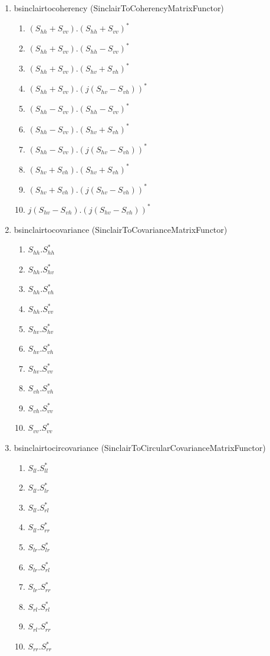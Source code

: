 \begin{enumerate}
\renewcommand{\labelenumii}{Channel \arabic{enumii} : }
\setcounter{enumi}{7}

\item bsinclairtocoherency (SinclairToCoherencyMatrixFunctor)
\begin{enumerate}
\item $ (S_{hh}+S_{vv}).(S_{hh}+S_{vv})^{*} $ 
\item $ (S_{hh}+S_{vv}).(S_{hh}-S_{vv})^{*} $ 
\item $ (S_{hh}+S_{vv}).(S_{hv}+S_{vh})^{*} $ 
\item $ (S_{hh}+S_{vv}).( j (S_{hv}-S_{vh}))^{*} $ 
\item $ (S_{hh}-S_{vv}).(S_{hh}-S_{vv})^{*} $ 
\item $ (S_{hh}-S_{vv}).(S_{hv}+S_{vh})^{*} $ 
\item $ (S_{hh}-S_{vv}).( j (S_{hv}-S_{vh}))^{*} $ 
\item $ (S_{hv}+S_{vh}).(S_{hv}+S_{vh})^{*} $ 
\item $ (S_{hv}+S_{vh}).( j (S_{hv}-S_{vh}))^{*} $ 
\item $ j (S_{hv}-S_{vh}).( j (S_{hv}-S_{vh}))^{*} $
\end{enumerate}
 
\item bsinclairtocovariance (SinclairToCovarianceMatrixFunctor)
\begin{enumerate}
\item $ S_{hh}.S_{hh}^{*} $ 
\item $ S_{hh}.S_{hv}^{*} $ 
\item $ S_{hh}.S_{vh}^{*} $ 
\item $ S_{hh}.S_{vv}^{*} $ 
\item $ S_{hv}.S_{hv}^{*} $ 
\item $ S_{hv}.S_{vh}^{*} $ 
\item $ S_{hv}.S_{vv}^{*} $ 
\item $ S_{vh}.S_{vh}^{*} $ 
\item $ S_{vh}.S_{vv}^{*} $ 
\item $ S_{vv}.S_{vv}^{*} $
\end{enumerate}
 
\item bsinclairtocircovariance (SinclairToCircularCovarianceMatrixFunctor)
\begin{enumerate}
\item $ S_{ll}.S_{ll}^{*} $ 
\item $ S_{ll}.S_{lr}^{*} $ 
\item $ S_{ll}.S_{rl}^{*} $ 
\item $ S_{ll}.S_{rr}^{*} $ 
\item $ S_{lr}.S_{lr}^{*} $ 
\item $ S_{lr}.S_{rl}^{*} $ 
\item $ S_{lr}.S_{rr}^{*} $ 
\item $ S_{rl}.S_{rl}^{*} $ 
\item $ S_{rl}.S_{rr}^{*} $ 
\item $ S_{rr}.S_{rr}^{*} $ 
\end{enumerate}


\end{enumerate}
